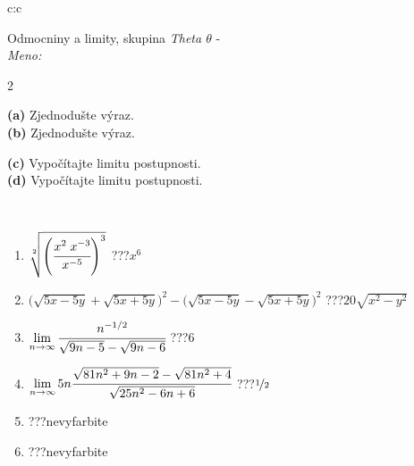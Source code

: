 \documentclass[10pt]{report}
\begin{document}
\begin{tabular}{c:c}
\begin{minipage}[c][104.5mm][t]{0.5\linewidth}
\begin{center}
\vspace{7mm}
{\huge Odmocniny a limity, skupina \textit{Theta $\theta$} -}\\[5mm]
\textit{Meno:}\phantom{xxxxxxxxxxxxxxxxxxxxxxxxxxxxxxxxxxxxxxxxxxxxxxxxxxxxxxxxxxxxxxxxx}\\[5mm]
\begin{minipage}{0.95\linewidth}
\begin{center}
{\small \begin{multicols}{2} \raggedright
\textbf{(a)} Zjednodušte výraz. \\[1mm]
\textbf{(b)} Zjednodušte výraz. \par \columnbreak
\textbf{(c)} Vypočítajte limitu postupnosti. \\[1mm]
\textbf{(d)} Vypočítajte limitu postupnosti.
\end{multicols}
}
\end{center}
\end{minipage}
\\[4mm]
\begin{minipage}{0.79\linewidth}
\begin{center}
\begin{varwidth}{\linewidth}
\begin{enumerate}
\small
\item $\sqrt[2]{\left(\cfrac{x^{2}\;x^{-3}}{x^{-5}}\right)^{3}}$\quad \dotfill\; ???\;\dotfill \quad $x^{6}$
\item {\footnotesize{\scriptsize$\big(\sqrt{5x-5y}+\sqrt{5x+5y}\big)^2-\big(\sqrt{5x-5y}-\sqrt{5x+5y}\big)^2$}\quad \dotfill\; ???\;\dotfill \quad $20\sqrt{x^2-y^2}$}
\item $\lim\limits_{n\to\infty}\cfrac{n^{-1/2}}{\sqrt{9n-5}-\sqrt{9n-6}}$\quad \dotfill\; ???\;\dotfill \quad $6$
\item $\lim\limits_{n\to\infty}5n\cfrac{\sqrt{81n^2+9n-2}-\sqrt{81n^2+4}}{\sqrt{25n^2-6n+6}}$\quad \dotfill\; ???\;\dotfill \quad $\nicefrac{1}{2}$
\item \quad \dotfill\; ???\;\dotfill \quad nevyfarbite
\item \quad \dotfill\; ???\;\dotfill \quad nevyfarbite
\end{enumerate}
\end{varwidth}
\end{center}
\end{minipage}

\end{center}
\end{minipage}
\end{tabular}
\end{document}
